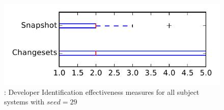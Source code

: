 
\begin{figure}
\centering
\includegraphics[height=0.4\textheight]{figures/dit_seed/rq1_tiny_29}
\caption{\rtwo: Developer Identification effectiveness measures for all subject systems with $seed=29$}
\label{fig:dit_seed:rq1:tiny}
\end{figure}
